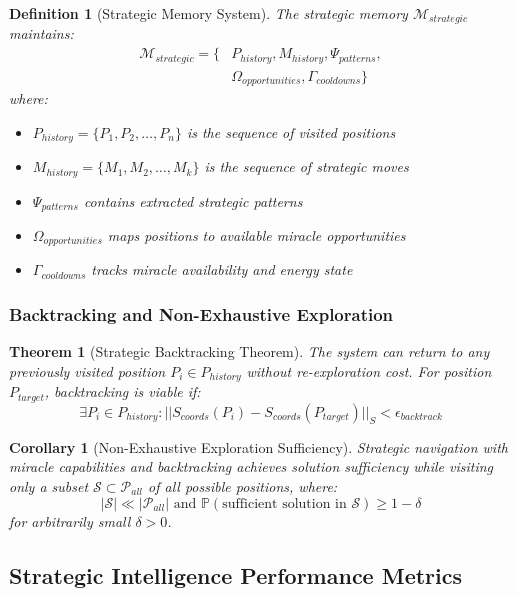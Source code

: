 \documentclass[12pt,a4paper]{article}
\newtheorem{theorem}{Theorem}
\newtheorem{definition}{Definition}
\newtheorem{corollary}{Corollary}
\begin{document}
\begin{definition}[Strategic Memory System]
The strategic memory $\mathcal{M}_{strategic}$ maintains:
\begin{align}
\mathcal{M}_{strategic} = \{&P_{history}, M_{history}, \Psi_{patterns}, \\
&\Omega_{opportunities}, \Gamma_{cooldowns}\}
\end{align}
where:
\begin{itemize}
\item $P_{history} = \{P_1, P_2, \ldots, P_n\}$ is the sequence of visited positions
\item $M_{history} = \{M_1, M_2, \ldots, M_k\}$ is the sequence of strategic moves
\item $\Psi_{patterns}$ contains extracted strategic patterns
\item $\Omega_{opportunities}$ maps positions to available miracle opportunities
\item $\Gamma_{cooldowns}$ tracks miracle availability and energy state
\end{itemize}
\end{definition}

\subsubsection{Backtracking and Non-Exhaustive Exploration}

\begin{theorem}[Strategic Backtracking Theorem]
The system can return to any previously visited position $P_i \in P_{history}$ without re-exploration cost. For position $P_{target}$, backtracking is viable if:
$$\exists P_i \in P_{history} : ||S_{coords}(P_i) - S_{coords}(P_{target})||_S < \epsilon_{backtrack}$$
\end{theorem}

\begin{corollary}[Non-Exhaustive Exploration Sufficiency]
Strategic navigation with miracle capabilities and backtracking achieves solution sufficiency while visiting only a subset $\mathcal{S} \subset \mathcal{P}_{all}$ of all possible positions, where:
$$|\mathcal{S}| \ll |\mathcal{P}_{all}| \text{ and } \mathbb{P}(\text{sufficient solution in } \mathcal{S}) \geq 1 - \delta$$
for arbitrarily small $\delta > 0$.
\end{corollary}

\subsection{Strategic Intelligence Performance Metrics}
\end{document}
